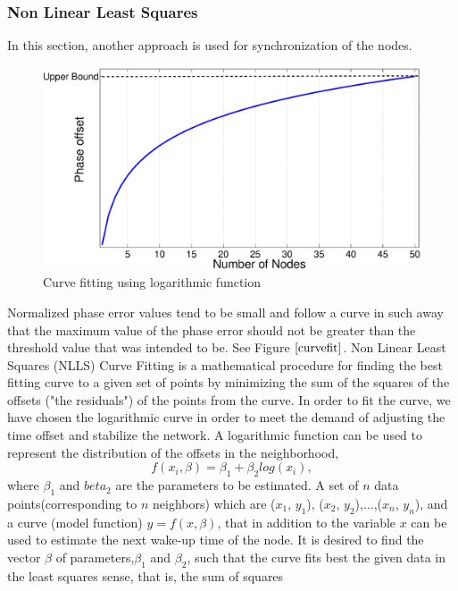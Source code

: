 \documentclass[a4paper,10pt]{report}
\begin{document}
\subsubsection{Non Linear Least Squares}
In this section, another approach is used for synchronization of the nodes.
\newline
\begin{figure}
\centering
\includegraphics[width=0.75 \textwidth]{curvefit}
\caption{Curve fitting using logarithmic function} \label{curvefit}
\end{figure}
Normalized phase error values tend to be small and follow a curve in such away that the maximum value of the phase error should not be greater than the threshold value that was intended to be. See Figure $\ref{curvefit}$. 
\newline
Non Linear Least Squares (NLLS) Curve Fitting  is a mathematical procedure for finding the best fitting curve to a given set of points by minimizing the sum of the squares of the offsets ("the residuals") of the points from the curve. In order to fit the curve, we have chosen the logarithmic curve in order to meet the demand of adjusting the time offset and stabilize the network. A logarithmic function can be used to represent the distribution of the offsets in the neighborhood, 
\begin{equation}
 f(x_i,\beta)= \beta _1 + \beta_2 log(x_i),
\end{equation}
where $\beta_1$ and $beta_2$ are the parameters to be estimated.\newline
A set of $n$ data points(corresponding to $n$ neighbors) which are ($x_1$, $y_1$), ($x_2$, $y_2$),$\dots$,($x_n$, $y_n$), and a curve (model function) $y= f(x, \beta)$, that in addition to the variable $x$ can be used to estimate the next wake-up time of the node.
\newline
It is desired to find the vector $\beta$ of parameters,$\beta_1$ and $\beta_2$, such that the curve fits best the given data in the least squares sense, that is, the sum of squares
\end{document}
